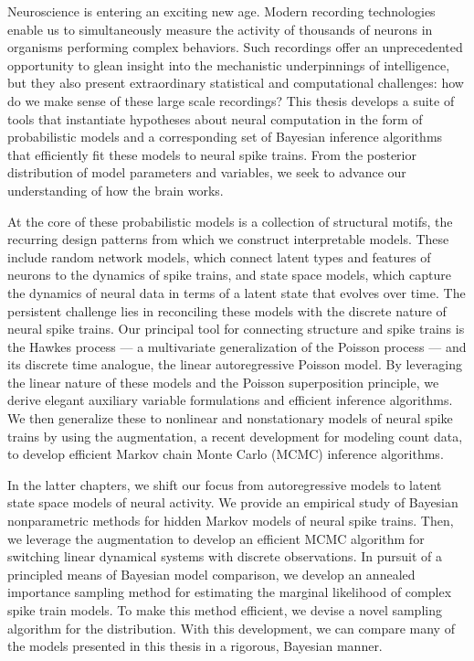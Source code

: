 Neuroscience is entering an exciting new age.  Modern recording
technologies enable us to simultaneously measure the activity of
thousands of neurons in organisms performing complex behaviors.  Such
recordings offer an unprecedented opportunity to glean insight into
the mechanistic underpinnings of intelligence, but they also present
extraordinary statistical and computational challenges: how do we make
sense of these large scale recordings?
This thesis develops a suite of tools that instantiate
hypotheses about neural computation in the form of
probabilistic models and a corresponding set of Bayesian inference
algorithms that efficiently fit these models to neural spike trains.
From the posterior distribution of model parameters and variables,
we seek to advance our understanding of how the brain works. 

At the core of these probabilistic models is a collection of
structural motifs, the recurring design patterns from which we
construct interpretable models. These include random network models,
which connect latent types and features of neurons to the dynamics of
spike trains, and state space models, which capture the dynamics of
neural data in terms of a latent state that evolves over time.  The
persistent challenge lies in reconciling these models with the
discrete nature of neural spike trains.  Our principal tool for
connecting structure and spike trains is the Hawkes process --- a
multivariate generalization of the Poisson process --- and its
discrete time analogue, the linear autoregressive Poisson model.  By
leveraging the linear nature of these models and the Poisson
superposition principle, we derive elegant auxiliary variable
formulations and efficient inference algorithms. We then generalize
these to nonlinear and nonstationary models of neural spike trains by
using the \polyagamma augmentation, a recent development for modeling
count data, to develop efficient Markov chain Monte Carlo (MCMC)
inference algorithms.

In the latter chapters, we shift our focus from autoregressive models
to latent state space models of neural activity. We provide an
empirical study of Bayesian nonparametric methods for hidden Markov
models of neural spike trains. Then, we leverage the \polyagamma
augmentation to develop an efficient MCMC algorithm for switching
linear dynamical systems with discrete observations.  In pursuit of a
principled means of Bayesian model comparison, we develop an annealed
importance sampling method for estimating the marginal likelihood of 
complex spike train models. To make this method efficient, 
we devise a novel sampling algorithm for the 
\polyagamma distribution. With this development, we can compare 
many of the models presented in this thesis in a rigorous, Bayesian
manner.

